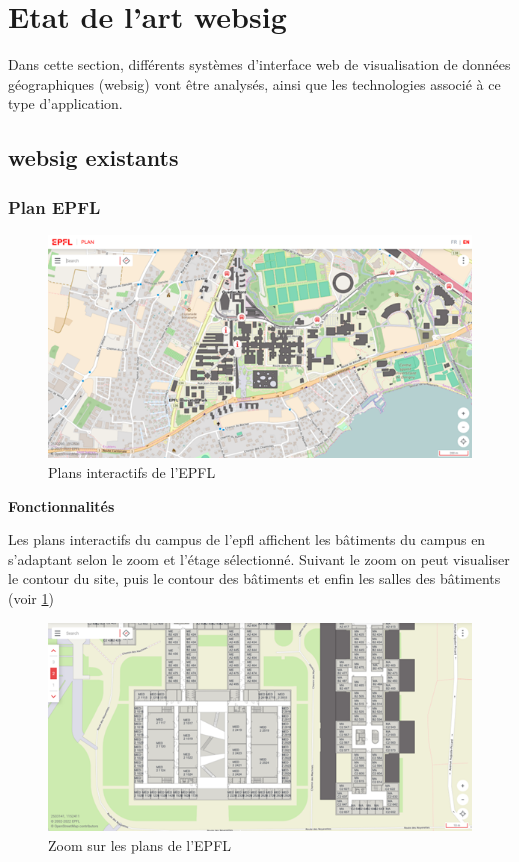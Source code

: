 \documentclass[
    iai, %
    il, %
]{heig-tb}
\begin{document}
\section{Etat de l'art \Gls{websig}}
Dans cette section, différents systèmes d'interface web de visualisation de données géographiques (\gls{websig}) vont être analysés, ainsi que les technologies
associé à ce type d'application.

\subsection{\Gls{websig} existants}

\subsubsection{Plan EPFL}
\begin{figure}[h]
    \centering
    \includegraphics[scale=0.7]{planEPFL.png}
    \caption{Plans interactifs de l'EPFL}
\end{figure}

\textbf{Fonctionnalités}

Les plans interactifs du campus de l'\gls{epfl} \cite{plan-epfl} affichent les bâtiments du campus en s'adaptant selon le zoom et l'étage sélectionné.
Suivant le zoom on peut visualiser le contour du site, puis le contour des bâtiments et enfin les salles des bâtiments (voir \ref{fig:EPFLZoom})

\begin{figure}[h]
    \centering
    \includegraphics[scale=0.7]{planEPFLGrosPlan.png}
    \caption{Zoom sur les plans de l'EPFL }
    \label{fig:EPFLZoom}
\end{figure}
\end{document}
